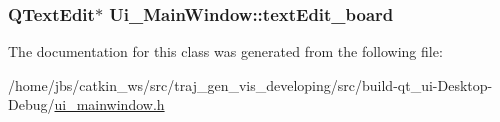 \subsubsection[{\texorpdfstring{text\+Edit\+\_\+board}{textEdit_board}}]{\setlength{\rightskip}{0pt plus 5cm}Q\+Text\+Edit$\ast$ Ui\+\_\+\+Main\+Window\+::text\+Edit\+\_\+board}\hypertarget{class_ui___main_window_af13441b9fd874f1aeb2ec5cefaeb0bce}{}\label{class_ui___main_window_af13441b9fd874f1aeb2ec5cefaeb0bce}


The documentation for this class was generated from the following file\+:\begin{DoxyCompactItemize}
\item 
/home/jbs/catkin\+\_\+ws/src/traj\+\_\+gen\+\_\+vis\+\_\+developing/src/build-\/qt\+\_\+ui-\/\+Desktop-\/\+Debug/\hyperlink{ui__mainwindow_8h}{ui\+\_\+mainwindow.\+h}\end{DoxyCompactItemize}
